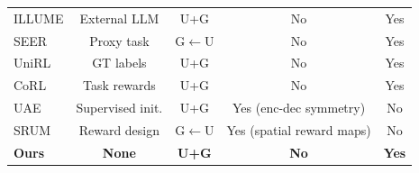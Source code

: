 \begin{table}[t]
{\begin{tabular}{@{}lcccc@{}}
    ILLUME \cite{wang2024illume}            & External LLM    & U+G            & No                               & Yes \\
    SEER \cite{tang2026endogenous}         & Proxy task      & G$\leftarrow$U & No                               & Yes \\
    UniRL \cite{mao2025unirl}              & GT labels       & U+G            & No                               & Yes \\
    CoRL \cite{jiang2025coreinforcement}   & Task rewards    & U+G            & No                               & Yes \\
    UAE \cite{yan2025understandinggeneration} & Supervised init. & U+G         & Yes (enc-dec symmetry)           & No  \\
    SRUM \cite{jin2025srum}                & Reward design   & G$\leftarrow$U & Yes (spatial reward maps)        & No  \\
    \midrule
    \rowcolor{green!8}
    \textbf{Ours}                          & \textbf{None}   & \textbf{U+G}   & \textbf{No}                      & \textbf{Yes} \\
    \bottomrule
  \end{tabular}%
  }
\end{table}

